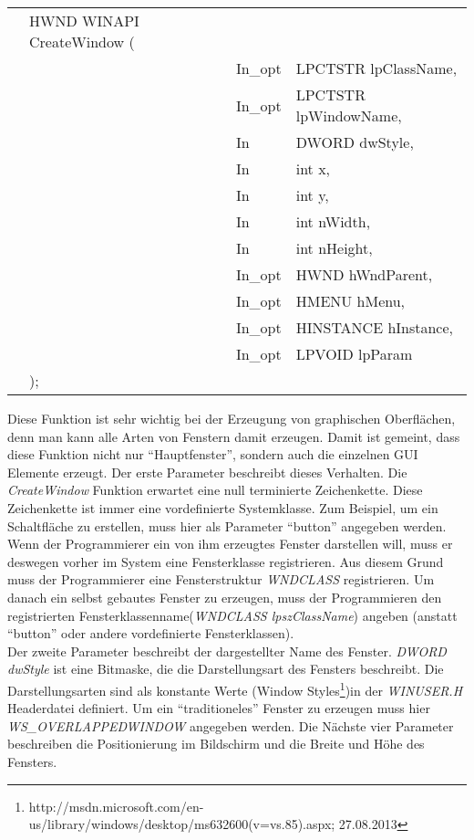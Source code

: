 \begin{tabular}{llll}
&HWND WINAPI CreateWindow (&\\
& & In\_opt & LPCTSTR lpClassName,\\
& & In\_opt & LPCTSTR lpWindowName,\\
& & In      & DWORD dwStyle,\\
& & In      & int x,\\
& & In      & int y,\\
& & In      & int nWidth,\\
& & In      & int nHeight,\\
& & In\_opt & HWND hWndParent,\\
& & In\_opt & HMENU hMenu,\\
& & In\_opt & HINSTANCE hInstance,\\
& & In\_opt & LPVOID lpParam\\
&);
\end{tabular}

Diese Funktion ist sehr wichtig bei der Erzeugung von graphischen Oberflächen, denn man kann alle Arten von Fenstern damit erzeugen. Damit ist gemeint, dass diese Funktion  nicht nur "`Hauptfenster"', sondern auch die einzelnen GUI Elemente erzeugt. Der erste Parameter beschreibt dieses Verhalten. Die \textit{CreateWindow} Funktion erwartet eine null terminierte Zeichenkette. Diese Zeichenkette ist immer eine vordefinierte Systemklasse. Zum Beispiel, um ein Schaltfläche zu erstellen, muss hier als Parameter "`button"' angegeben werden. Wenn der Programmierer ein von ihm erzeugtes Fenster darstellen will, muss er deswegen vorher im System eine Fensterklasse registrieren. Aus diesem Grund muss der Programmierer eine Fensterstruktur \textit{WNDCLASS} registrieren. Um danach ein selbst gebautes Fenster zu erzeugen, muss der Programmieren den registrierten Fensterklassenname(\textit{WNDCLASS lpszClassName}) angeben (anstatt "`button"' oder andere vordefinierte Fensterklassen).\\

Der zweite Parameter beschreibt der dargestellter Name des Fenster. \textit{DWORD dwStyle} ist eine Bitmaske, die die Darstellungsart des Fensters beschreibt. Die Darstellungsarten sind als konstante Werte (Window Styles\footnote{http://msdn.microsoft.com/en-us/library/windows/desktop/ms632600(v=vs.85).aspx; 27.08.2013})in der \textit{WINUSER.H} Headerdatei definiert. Um ein "`traditioneles"' Fenster zu erzeugen muss hier \textit{WS\_OVERLAPPEDWINDOW} angegeben werden. Die Nächste vier Parameter beschreiben die Positionierung im Bildschirm und die Breite und Höhe des Fensters.\\ 


